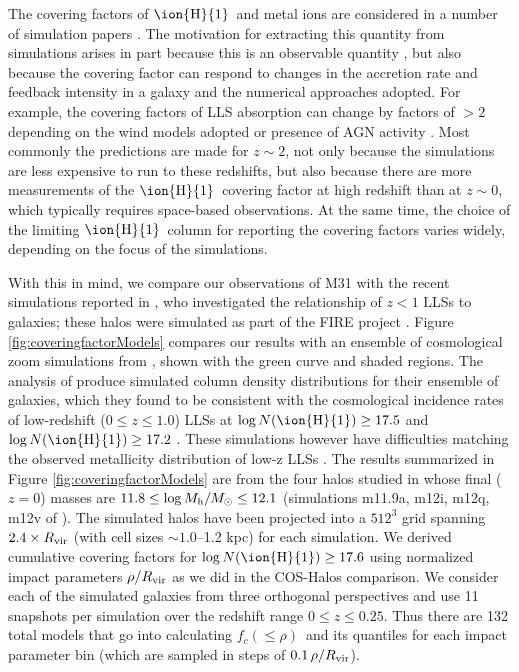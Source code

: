 \documentclass[12pt,preprint]{aastex6}
\newcommand{\HI}{\ensuremath{\mbox{\ion{H}{1}}}}
\newcommand{\logNHI}{\ensuremath{\log N(\mbox{\ion{H}{1}})}\relax}
\newcommand{\Rvir}{\ensuremath{R_{\rm vir}}\relax}
\newcommand{\fccum}{\ensuremath{f_c(\le \rho)}\relax}
\begin{document}
The covering factors of \HI\ and metal ions are considered in a number
of simulation papers \citep{fumagalli2011, cafg2011, shen2012,
  fernandez2012, fumagalli2014, cafg2015, suresh2015, cafg2016,
  gutcke2016, liang2016}. The motivation for extracting this quantity
from simulations arises in part because this is an observable quantity
\citep{rudie2012,prochaska2013}, but also because the covering factor
can respond to changes in the accretion rate and feedback intensity in
a galaxy and the numerical approaches adopted.  For example, the
covering factors of LLS absorption can change by factors of $>2$
depending on the wind models adopted or presence of AGN activity
\citep[e.g.,][]{suresh2015}. Most commonly the predictions are made
for $z\sim2$, not only because the simulations are less expensive to run
to these redshifts, but also because there are more measurements of
the \HI\ covering factor at high redshift than at $z\sim0$, which
typically requires space-based observations. At the same time, the
choice of the limiting \HI\ column for reporting the covering factors
varies widely, depending on the focus of the simulations.

With this in mind, we compare our observations of M31 with the recent
simulations reported in , who investigated the
relationship of $z<1$ LLSs to galaxies; these halos were simulated as
part of the FIRE project \citep{hopkins2014}. Figure
\ref{fig:coveringfactorModels} compares our results with an ensemble
of cosmological zoom simulations from , shown
with the green curve and shaded regions.  The analysis of
 produce simulated column density distributions
for their ensemble of galaxies, which they found to be consistent with
the cosmological incidence rates of low-redshift ($0 \le z \le 1.0$)
LLSs at $\logNHI \ge 17.5$ and $\logNHI\ge 17.2$
\citep{ribaudo2011}. These simulations however have difficulties
matching the observed metallicity distribution of low-z LLSs
\citep{lehner2013, wotta2016}.  The results summarized in Figure
\ref{fig:coveringfactorModels} are from the four halos studied in
 whose final ($z = 0$) masses are
$11.8 \le \log M_{\rm h}/M_\odot \le 12.1$ (simulations m11.9a, m12i,
m12q, m12v of ). The simulated halos have been
projected into a $512^3$ grid spanning $2.4\times R_{\rm vir}$ (with
cell sizes $\sim1.0$--1.2 kpc) for each simulation.  We derived
cumulative covering factors for $\log N(\mbox{\HI}) \ge 17.6$ using
normalized impact parameters $\rho/R_{\rm vir}$ as we did in the
COS-Halos comparison. We consider each of the simulated galaxies from
three orthogonal perspectives and use 11 snapshots per simulation over
the redshift range $0 \le z \le 0.25$.  Thus there are 132 total
models that go into calculating \fccum\ and its quantiles for each
impact parameter bin (which are sampled in steps of
$0.1 \, \rho/\Rvir$).
\end{document}
